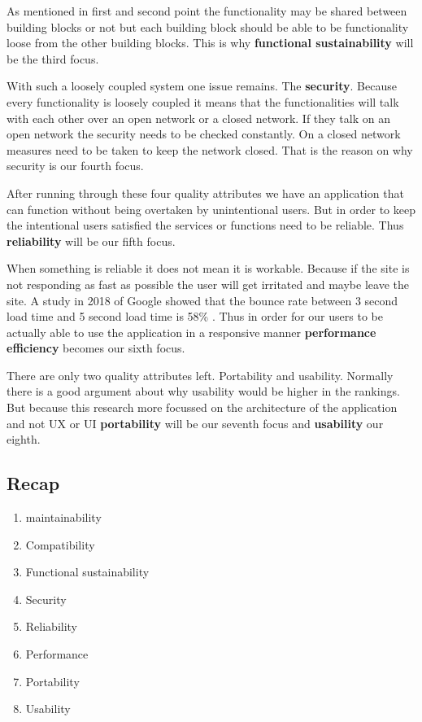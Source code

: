As mentioned in first and second point the functionality may be shared between building blocks or not but each building block should be able to be functionality loose from the other building blocks. This is why \textbf{functional sustainability} will be the third focus.

With such a loosely coupled system one issue remains. The \textbf{security}. Because every functionality is loosely coupled it means that the functionalities will talk with each other over an open network or a closed network. If they talk on an open network the security needs to be checked constantly. On a closed network measures need to be taken to keep the network closed. That is the reason on why security is our fourth focus.

After running through these four quality attributes we have an application that can function without being overtaken by unintentional users. But in order to keep the intentional users satisfied the services or functions need to be reliable. Thus \textbf{reliability} will be our fifth focus.

When something is reliable it does not mean it is workable. Because if the site is not responding as fast as possible the user will get irritated and maybe leave the site. A study in 2018 of Google showed that the bounce rate between 3 second load time and 5 second load time is 58\% \cite{bounceRateDifference}. Thus in order for our users to be actually able to use the application in a responsive manner \textbf{performance efficiency} becomes our sixth focus.

There are only two quality attributes left. Portability and usability. Normally there is a good argument about why usability would be higher in the rankings. But because this research more focussed on the architecture of the application and not UX or UI \textbf{portability} will be our seventh focus and \textbf{usability} our eighth.

\subsection{Recap}
\label{sec:IsoRecap}

\begin{enumerate}
        \item maintainability
        \item Compatibility
        \item Functional sustainability
        \item Security
        \item Reliability
        \item Performance
        \item Portability
        \item Usability
\end{enumerate}


